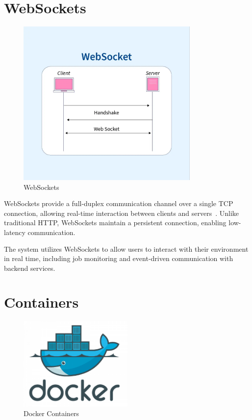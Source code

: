 \section{WebSockets}
\begin{figure}[h!]
  \centering
  \includegraphics[width=0.8\textwidth]{Images/websockets-1.png}
  \caption{WebSockets}
  \label{fig:websockets}
\end{figure}

WebSockets provide a full-duplex communication channel over a single TCP connection, allowing real-time interaction between 
clients and servers~\cite{ietf-websocket}. Unlike traditional HTTP, WebSockets maintain a persistent connection, enabling low-latency communication.

The system utilizes WebSockets to allow users to interact with their environment in real time, including job monitoring and 
event-driven communication with backend services.
\section{Containers}

\begin{figure}[h!]
  \centering
  \includegraphics[width=0.5\textwidth]{Images/what-is-docker.png}
  \caption{Docker Containers}
  \label{fig:docker-containers}
\end{figure}

